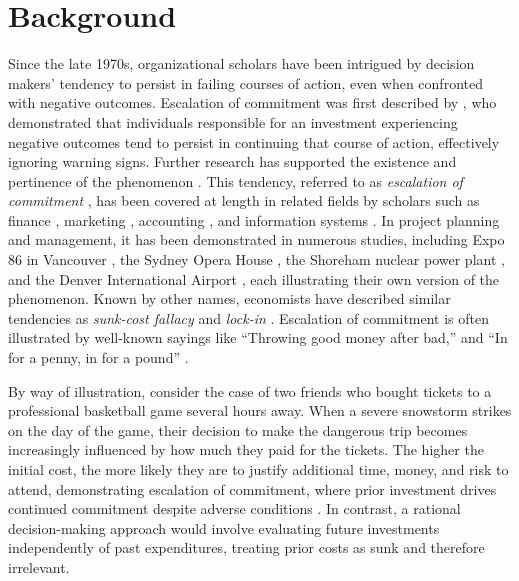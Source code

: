 \documentclass[letterpaper]{article} %
\begin{document}
\section{Background}

Since the late 1970s, organizational scholars have been intrigued by decision makers’ tendency to persist in failing courses of action, even when confronted with negative outcomes. Escalation of commitment was first described by \cite{Staw-1976}, who demonstrated that individuals responsible for an investment experiencing negative outcomes tend to persist in continuing that course of action, effectively ignoring warning signs. Further research has supported the existence and pertinence of the phenomenon \cite{Brockner-1992, Shapira-1997, Sleesman-2012, Drummond-2017, Drummond-2014, Salter-2013}. This tendency, referred to as \textit{escalation of commitment} \cite{Staw-1976}, has been covered at length in related fields by scholars such as finance \cite{Schulz-Cheng-2002}, marketing \cite{Schmidt-Calantone-2002}, accounting \cite{Jeffrey-1992}, and information systems \cite{Heng-2003}. In project planning and management, it has been demonstrated in numerous studies, including Expo 86 in Vancouver \cite{Ross-1986}, the Sydney Opera House \cite{flyvbjerg-2009}, the Shoreham nuclear power plant \cite{Ross-1993}, and the Denver International Airport \cite{Montealegre-2000}, each illustrating their own version of the phenomenon. Known by other names, economists have described similar tendencies as \textit{sunk-cost fallacy} \cite{Arkes-1985, Berg-2009} and \textit{lock-in} \cite{Cantarelli-2010}. Escalation of commitment is often illustrated by well-known sayings like ``Throwing good money after bad,'' and ``In for a penny, in for a pound'' \cite{Flyvbjerg-2021}.

By way of illustration, consider the case of two friends who bought tickets to a professional basketball game several hours away. When a severe snowstorm strikes on the day of the game, their decision to make the dangerous trip becomes increasingly influenced by how much they paid for the tickets. The higher the initial cost, the more likely they are to justify additional time, money, and risk to attend, demonstrating escalation of commitment, where prior investment drives continued commitment despite adverse conditions \cite{Thaler-2016}. In contrast, a rational decision-making approach would involve evaluating future investments independently of past expenditures, treating prior costs as sunk and therefore irrelevant.
\end{document}

